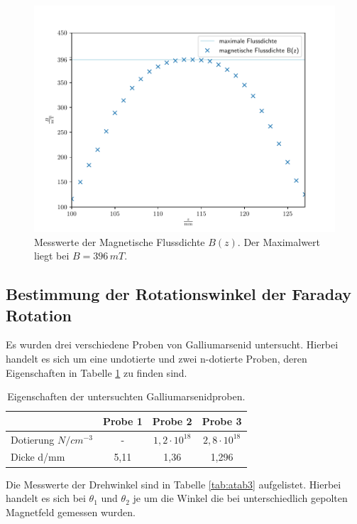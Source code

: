 \FloatBarrier
\begin{figure}[h]
    \centering
    \includegraphics[width=\textwidth]{magnetfeld.pdf}
    \caption{Messwerte der Magnetische Flussdichte $B(z)$. Der Maximalwert liegt bei $B = 396\,\si{mT}$.}
    \label{fig:afig1}
\end{figure}
\FloatBarrier
\noindent


\subsection{Bestimmung der Rotationswinkel der Faraday Rotation}
Es wurden drei verschiedene Proben von Galliumarsenid untersucht. Hierbei handelt es sich um eine undotierte und zwei n-dotierte Proben, deren Eigenschaften in Tabelle \ref{tab:atab2} zu finden sind.

\FloatBarrier
\begin{table}[h]
    \centering
    \caption{Eigenschaften der untersuchten Galliumarsenidproben.}
    \label{tab:atab2}
    \begin{tabular}{l c c c}
        \toprule
        {} & {Probe 1} & {Probe 2} & {Probe 3} \\
        \midrule
        Dotierung $N/cm^{-3}$ & - & $1,2 \cdot 10^{18}$ & $2,8 \cdot 10^{18}$ \\
        Dicke d/mm & 5,11 & 1,36 & 1,296 \\
        \bottomrule
    \end{tabular}
\end{table}
\FloatBarrier
\noindent


Die Messwerte der Drehwinkel sind in Tabelle \ref{tab:atab3} aufgelistet. Hierbei handelt es sich bei $\theta_1$ und $\theta_2$ je um die Winkel die bei unterschiedlich gepolten Magnetfeld gemessen wurden.

